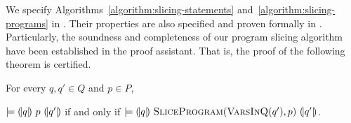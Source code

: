 We specify Algorithms~\ref{algorithm:slicing-statements}
and~\ref{algorithm:slicing-programs} in \gallina. Their properties are
also specified and proven formally in \coq. Particularly, the
soundness and completeness of our program slicing algorithm have been
established in the proof assistant. That is, the proof of the
following theorem is certified. 

\begin{theorem}
  For every $q, q' \in Q$ and $p \in P$,
  \begin{center}
  $\models {(\!|}{q}{|\!)}~{p}~{(\!|}{q'}{|\!)}$ if and only if
  $\models {(\!|}{q}{|\!)}~{\textsc{SliceProgram}(\textsc{VarsInQ}(q'), p)}~{(\!|}{q'}{|\!)}$.
  \end{center}
  \label{theorem:program-slicing}
\end{theorem}